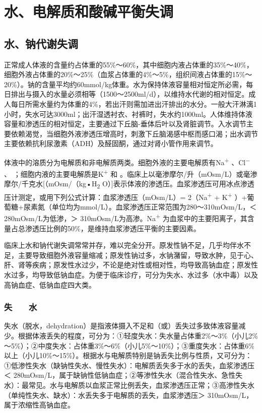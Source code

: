 \part{水、电解质和酸碱平衡失调}

\chapter{水、钠代谢失调}

正常成人体液的含量约占体重的55\%～60\%，其中细胞内液占体重的35\%～40\%，细胞外液占体重的20\%～25\%（血浆占体重的4\%～5\%，组织间液占体重的15\%～20\%）。钠的含量平均约60mmol/kg体重。水为保持体液容量相对恒定所必需，每日排出与摄入的水量必须相等（1500～2500ml/d），以维持水代谢的相对恒定。成人每日所需水量约为体重的4\%，若出汗则需加进出汗排出的水分。一般大汗淋漓1小时，失水可达3000ml；出汗湿透衬衣、衬裤时，失水约1000ml。人体维持体液容量和渗透压的相对恒定，主要通过下丘脑-垂体后叶以及肾脏调节。入水调节主要依赖渴觉，当细胞外液渗透压增高时，刺激下丘脑渴感中枢而感口渴；出水调节主要依赖抗利尿激素（ADH）及醛固酮，通过对肾小管作用来调节。

体液中的溶质分为电解质和非电解质两类。细胞外液的主要电解质有Na\textsuperscript{+}
、Cl\textsuperscript{−} 、{}
；细胞内液的主要电解质是K\textsuperscript{+} 和{}
。临床上以毫渗摩尔/升（mOsm/L）或毫渗摩尔/千克水{[}（mOsm/（kg•H\textsubscript{2}
O）{]}表示体液的渗透压。血浆渗透压可用冰点渗透压计测定，或用下列公式计算：血浆渗透压（mOsm/L）=
2（Na\textsuperscript{+} + K\textsuperscript{+}
）+葡萄糖+尿素氮（单位均为mmol/L）。血浆渗透压正常范围为280～310mOsm/L，＜
280mOsm/L为低渗，＞ 310mOsm/L为高渗。Na\textsuperscript{+}
为血浆中的主要阳离子，其含量占总渗透压比例的50\%，是维持血浆渗透压平衡的主要因素。

临床上水和钠代谢失调常常并存，难以完全分开。原发性钠不足，几乎均伴水不足，主要导致细胞外液容量缩减；原发性钠过多，水钠潴留，导致水肿，见于心、肝、肾等疾病；原发性水过少，不论是绝对性或相对性，均导致高钠血症；原发性水过多，均导致低钠血症。为便于临床诊疗，可分为失水、水过多（水中毒）以及高钠血症、低钠血症四大类。

\section{失　　水}

失水（脱水，dehydration）是指液体摄入不足和（或）丢失过多致体液容量减少。根据体液丢失的程度，可分为：①轻度失水：失水量占体重2\%～3\%（小儿2\%～5\%）；②中度失水：占体重3\%～6\%（小儿5\%～10\%）；③重度失水：占体重6\%以上（小儿10\%～15\%）。根据水与电解质特别是钠丢失比例与性质，又可分为：①低渗性失水（缺钠性失水、慢性失水）：电解质丢失多于水的丢失，血浆渗透压＜
280mOsm/L，属于缺钠性低钠血症；②等渗性失水（混合性失水、急性失水）：最常见。水与电解质以血浆正常比例丢失，血浆渗透压正常；③高渗性失水（单纯性失水、缺水）：水丢失多于电解质的丢失，血浆渗透压＞
310mOsm/L，属于浓缩性高钠血症。

